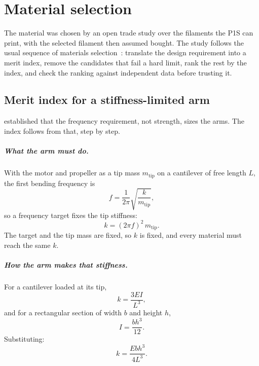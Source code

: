 \chapter{Material selection}\label{sec:material}

The material was chosen by an open trade study over the filaments the P1S can print, with the selected filament then assumed bought. The study follows the usual sequence of materials selection~\citep{ashby}: translate the design requirement into a merit index, remove the candidates that fail a hard limit, rank the rest by the index, and check the ranking against independent data before trusting it.

\section{Merit index for a stiffness-limited arm}\label{sec:material-index}

 established that the frequency requirement, not strength, sizes the arms. The index follows from that, step by step.

\paragraph{What the arm must do.} With the motor and propeller as a tip mass $m_\text{tip}$ on a cantilever of free length $L$, the first bending frequency is
\begin{equation}
f = \frac{1}{2\pi}\sqrt{\frac{k}{m_\text{tip}}},
\end{equation}
so a frequency target fixes the tip stiffness:
\begin{equation}
k = (2\pi f)^2\, m_\text{tip}.
\end{equation}
The target and the tip mass are fixed, so $k$ is fixed, and every material must reach the same $k$.

\paragraph{How the arm makes that stiffness.} For a cantilever loaded at its tip,
\begin{equation}
k = \frac{3EI}{L^3},
\end{equation}
and for a rectangular section of width $b$ and height $h$,
\begin{equation}
I = \frac{bh^3}{12}.
\end{equation}
Substituting:
\begin{equation}
k = \frac{Ebh^3}{4L^3}.
\end{equation}

